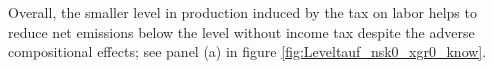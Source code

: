 Overall, the smaller level in production induced by the tax on labor helps to reduce net emissions below the level without income tax despite the adverse compositional effects; see panel (a) in figure \ref{fig:Leveltauf_nsk0_xgr0_know}.
 
% 
%  
  
